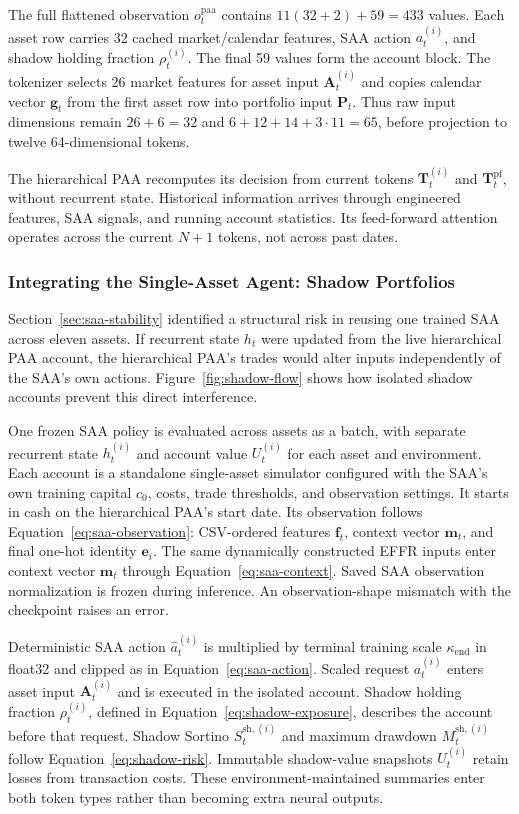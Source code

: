 The full flattened observation \(o_t^{\mathrm{paa}}\) contains \(11(32+2)+59=433\) values. Each asset row carries 32 cached market/calendar features, SAA action \(a_t^{(i)}\), and shadow holding fraction \(\rho_t^{(i)}\). The final 59 values form the account block. The tokenizer selects 26 market features for asset input \(\mathbf A_t^{(i)}\) and copies calendar vector \(\mathbf g_t\) from the first asset row into portfolio input \(\mathbf P_t\). Thus raw input dimensions remain \(26+6=32\) and \(6+12+14+3\cdot11=65\), before projection to twelve 64-dimensional tokens.

The hierarchical PAA recomputes its decision from current tokens \(\mathbf T_t^{(i)}\) and \(\mathbf T_t^{\mathrm{pf}}\), without recurrent state. Historical information arrives through engineered features, SAA signals, and running account statistics. Its feed-forward attention operates across the current \(N+1\) tokens, not across past dates.

\subsubsection{Integrating the Single-Asset Agent: Shadow Portfolios}
\label{sec:info-flow}

Section~\ref{sec:saa-stability} identified a structural risk in reusing one trained SAA across eleven assets. If recurrent state \(h_t\) were updated from the live hierarchical PAA account, the hierarchical PAA's trades would alter inputs independently of the SAA's own actions. Figure~\ref{fig:shadow-flow} shows how isolated shadow accounts prevent this direct interference.

One frozen SAA policy is evaluated across assets as a batch, with separate recurrent state \(h_t^{(i)}\) and account value \(U_t^{(i)}\) for each asset and environment. Each account is a standalone single-asset simulator configured with the SAA's own training capital \(c_0\), costs, trade thresholds, and observation settings. It starts in cash on the hierarchical PAA's start date. Its observation follows Equation~\eqref{eq:saa-observation}: CSV-ordered features \(\mathbf f_t\), context vector \(\mathbf m_t\), and final one-hot identity \(\mathbf e_i\). The same dynamically constructed EFFR inputs enter context vector \(\mathbf m_t\) through Equation~\eqref{eq:saa-context}. Saved SAA observation normalization is frozen during inference. An observation-shape mismatch with the checkpoint raises an error.

Deterministic SAA action \(\hat a_t^{(i)}\) is multiplied by terminal training scale \(\kappa_{\mathrm{end}}\) in float32 and clipped as in Equation~\eqref{eq:saa-action}. Scaled request \(a_t^{(i)}\) enters asset input \(\mathbf A_t^{(i)}\) and is executed in the isolated account. Shadow holding fraction \(\rho_t^{(i)}\), defined in Equation~\eqref{eq:shadow-exposure}, describes the account before that request. Shadow Sortino \(S_t^{\mathrm{sh},(i)}\) and maximum drawdown \(M_t^{\mathrm{sh},(i)}\) follow Equation~\eqref{eq:shadow-risk}. Immutable shadow-value snapshots \(U_t^{(i)}\) retain losses from transaction costs. These environment-maintained summaries enter both token types rather than becoming extra neural outputs.

